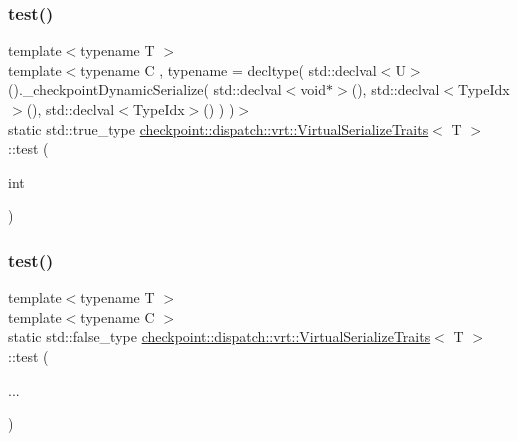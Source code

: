 \subsubsection{\texorpdfstring{test()}{test()}\hspace{0.1cm}{\footnotesize\ttfamily [1/2]}}
{\footnotesize\ttfamily template$<$typename T $>$ \\
template$<$typename C , typename  = decltype(      std\+::declval$<$\+U$>$().\+\_\+checkpoint\+Dynamic\+Serialize(        std\+::declval$<$void$\ast$$>$(),        std\+::declval$<$\+Type\+Idx$>$(),        std\+::declval$<$\+Type\+Idx$>$()      )    )$>$ \\
static std\+::true\+\_\+type \hyperlink{structcheckpoint_1_1dispatch_1_1vrt_1_1_virtual_serialize_traits}{checkpoint\+::dispatch\+::vrt\+::\+Virtual\+Serialize\+Traits}$<$ T $>$\+::test (\begin{DoxyParamCaption}\item[{int}]{ }\end{DoxyParamCaption})\hspace{0.3cm}{\ttfamily [static]}}

\mbox{\label{structcheckpoint_1_1dispatch_1_1vrt_1_1_virtual_serialize_traits_aa60ab3d3a5bdc4e36497b47dc35aae04}} 
\subsubsection{\texorpdfstring{test()}{test()}\hspace{0.1cm}{\footnotesize\ttfamily [2/2]}}
{\footnotesize\ttfamily template$<$typename T $>$ \\
template$<$typename C $>$ \\
static std\+::false\+\_\+type \hyperlink{structcheckpoint_1_1dispatch_1_1vrt_1_1_virtual_serialize_traits}{checkpoint\+::dispatch\+::vrt\+::\+Virtual\+Serialize\+Traits}$<$ T $>$\+::test (\begin{DoxyParamCaption}\item[{}]{... }\end{DoxyParamCaption})\hspace{0.3cm}{\ttfamily [static]}}



